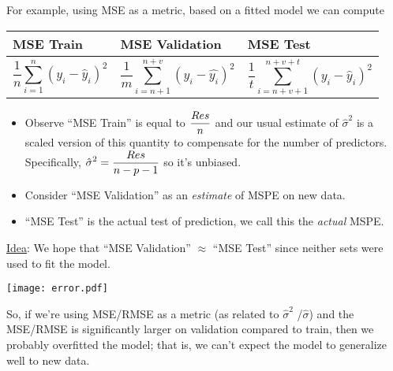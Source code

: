 For example, using MSE as a metric, based on a fitted model we can
compute
\begin{table}[ht]
    \centering
    \begin{tabularx}{\linewidth}{@{}YYY@{}}
        \toprule
        MSE Train & MSE Validation & MSE Test \\
        \midrule
        \[ \frac{1}{n} \sum_{i=1}^{n} (y_i-\hat{y}_i)^2 \]
                  &
        \[ \frac{1}{m} \sum_{i=n+1}^{n+v} (y_i-\hat{y_i})^2 \]
                  &
        \[ \frac{1}{t} \sum_{i=n+v+1}^{n+v+t}(y_i-\hat{y}_i)^2  \]
        \\
        \bottomrule
    \end{tabularx}
\end{table}

\begin{itemize}
    \item Observe ``MSE Train'' is equal to $ \displaystyle \frac{\relax{Res}}{n} $
          and our usual estimate of $ \hat{\sigma}^2 $
          is a scaled version of this quantity
          to compensate for the number of predictors. Specifically,
          $ \displaystyle  \hat{\sigma}^2=\frac{\relax{Res}}{n-p-1} $
          so it's unbiased.
    \item Consider ``MSE Validation'' as an \emph{estimate} of MSPE
          on new data.
    \item ``MSE Test'' is the actual test of prediction,
          we call this the \emph{actual} MSPE.\
\end{itemize}
\underline{Idea}: We hope that ``MSE Validation'' $ \approx $
``MSE Test'' since neither sets were used to fit the model.

\begin{minipage}{0.7\textwidth}
    \texttt{[image: error.pdf]}
\end{minipage}
\begin{minipage}{0.23\textwidth}
    \raggedright{}
    So, if we're using MSE/RMSE
    as a metric (as related to $ \hat{\sigma}^2 $ /$ \hat{\sigma} $)
    and the MSE/RMSE is significantly larger
    on validation compared to train,
    then we probably overfitted the model;
    that is, we can't expect the model
    to generalize well to new data.
\end{minipage}
